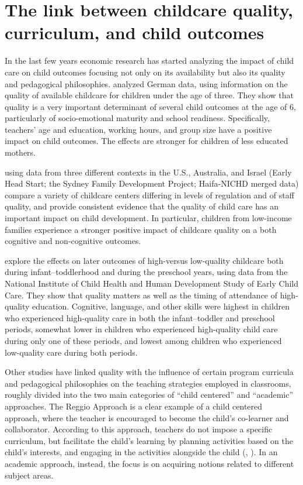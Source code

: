 \documentclass[12pt]{article}
\begin{document}
\bigskip

\section{The link between childcare quality, curriculum, and child outcomes}

\label{sec:lit}

In the last few years economic research has started analyzing the impact of
child care on child outcomes focusing not only on its availability but also
its quality and pedagogical philosophies. \cite{Felfe2015a} analyzed German
data, using information on the quality of available childcare for children
under the age of three. They show that quality is a very important
determinant of several child outcomes at the age of 6, particularly of
socio-emotional maturity and school readiness. Specifically, teachers' age
and education, working hours, and group size have a positive impact on child
outcomes. The effects are stronger for children of less educated mothers.

\cite{Love2003} using data from three different contexts in the U.S.,
Australia, and Israel (Early Head Start; the Sydney Family Development
Project; Haifa-NICHD merged data) compare a variety of childcare centers
differing in levels of regulation and of staff quality, and provide
consistent evidence that the quality of child care has an important impact
on child development. In particular, children from low-income families
experience a stronger positive impact of childcare quality on a both
cognitive and non-cognitive outcomes.

\cite{Li2013} explore the effects on later outcomes of high-versus
low-quality childcare both during infant--toddlerhood and during the
preschool years, using data from the National Institute of Child Health and
Human Development Study of Early Child Care. They show that quality matters
as well as the timing of attendance of high-quality education. Cognitive,
language, and other skills were highest in children who experienced
high-quality care in both the infant--toddler and preschool periods,
somewhat lower in children who experienced high-quality child care during
only one of these periods, and lowest among children who experienced
low-quality care during both periods.

Other studies have linked quality with the influence of certain program
curricula and pedagogical philosophies on the teaching strategies employed
in classrooms, roughly divided into the two main categories of ``child
centered'' and ``academic'' approaches. The Reggio Approach is a clear
example of a child centered approach, where the teacher is encouraged to
become the child's co-learner and collaborator. According to this approach,
teachers do not impose a specific curriculum, but facilitate the child's
learning by planning activities based on the child's interests, and engaging
in the activities alongside the child (\cite{Malaguzzi1993}, \cite%
{Hewett2001}). In an academic approach, instead, the focus is on acquiring
notions related to different subject areas.
\end{document}
